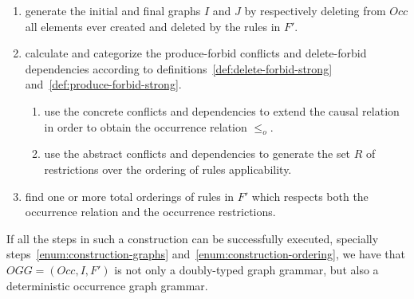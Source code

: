 \begin{definition}
\begin{enumerate}
\item\label{enum:construction-graphs} generate the initial and final graphs $I$ and $J$ by respectively deleting from $Occ$ all elements ever created and deleted by the rules in $F'$.

\item\label{enum:construction-occurrence} calculate and categorize the produce-forbid conflicts and delete-forbid dependencies according to definitions~\ref{def:delete-forbid-strong} and~\ref{def:produce-forbid-strong}.

\begin{enumerate}
\item\label{enum:construction-analysis} use the concrete conflicts and dependencies to extend the causal relation in order to obtain the occurrence relation $\leq_o$.

\item\label{enum:construction-restriction} use the abstract conflicts and dependencies to generate the set $R$ of restrictions over the ordering of rules applicability.
\end{enumerate}

\item\label{enum:construction-ordering} find one or more total orderings of rules in $F'$ which respects both the occurrence relation and the occurrence restrictions.
\end{enumerate}

\end{definition}

If all the steps in such a construction can be successfully executed, specially steps~\ref{enum:construction-graphs} and~\ref{enum:construction-ordering}, we have that $OGG = (Occ, I, F')$ is not only a doubly-typed graph grammar, but also a deterministic occurrence graph grammar. %

